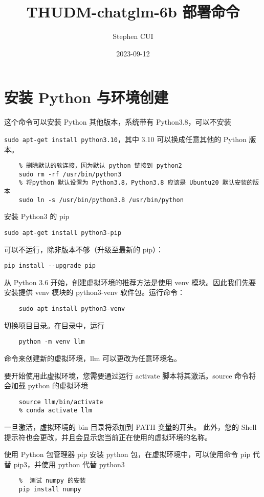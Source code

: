 \documentclass{article}
\title{THUDM-chatglm-6b 部署命令}
\author{Stephen CUI}
\date{2023-09-12}
\begin{document}
\maketitle

\tableofcontents

\section{安装 Python 与环境创建}
这个命令可以安装 Python 其他版本，系统带有 Python3.8，可以不安装

\verb|sudo apt-get install python3.10|，其中 3.10 可以换成任意其他的 Python 版本。

\begin{verbatim}
    % 删除默认的软连接，因为默认 python 链接到 python2
    sudo rm -rf /usr/bin/python3
    % 将python 默认设置为 Python3.8，Python3.8 应该是 Ubuntu20 默认安装的版本
    sudo ln -s /usr/bin/python3.8 /usr/bin/python
\end{verbatim}

安装 Python3 的 pip

\verb|sudo apt-get install python3-pip|

可以不运行，除非版本不够（升级至最新的 pip）：

\verb|pip install --upgrade pip|

从 Python 3.6 开始，创建虚拟环境的推荐方法是使用 venv 模块。因此我们先要安装提供 venv 模块的 python3-venv 软件包。运行命令：
\begin{verbatim}
    sudo apt install python3-venv
\end{verbatim}

切换项目目录。在目录中，运行
\begin{verbatim}
    python -m venv llm
\end{verbatim}
命令来创建新的虚拟环境，llm 可以更改为任意环境名。

要开始使用此虚拟环境，您需要通过运行 activate 脚本将其激活。source 命令将会加载 python 的虚拟环境
\begin{verbatim}
    source llm/bin/activate
    % conda activate llm
\end{verbatim}

一旦激活，虚拟环境的 bin 目录将添加到 PATH 变量的开头。 此外，您的 Shell 提示符也会更改，并且会显示您当前正在使用的虚拟环境的名称。

使用 Python 包管理器 pip 安装 python 包，在虚拟环境中，可以使用命令 pip 代替 pip3，并使用 python 代替 python3
\begin{verbatim}
    %  测试 numpy 的安装
    pip install numpy  
\end{verbatim}
\end{document}

